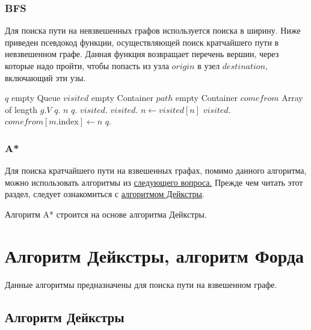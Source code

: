 \subsubsection{BFS}
Для поиска пути на невзвешенных графов используется поиска в ширину. Ниже приведен псевдокод функции,
осуществляющей поиск кратчайшего пути в невзвешенном графе. Данная функция возвращает перечень вершин,
через которые надо пройти, чтобы попасть из узла $origin$ в узел $destination$, включающий эти узы.
\begin{algorithmic}
  \State $q$ \asgn empty Queue
  \State $visited$ \asgn empty Container
  \State $path$ \asgn empty Container
  \State $comefrom$ \asgn Array of length $g.V$
  \State $q$.
    \State $n$ \asgn $q$.
    \State $visited$.
      \State $visited$.
        \State $n \gets visited[n]$
        \State $visited$.
      \EndWhile
      \State {}
    \EndIf
        \State $comefrom[m.\text{index}] \gets n$
        \State $q$.
      \EndIf
    \EndFor
  \EndWhile
  \State {} 
\EndFunction
\end{algorithmic}
\subsubsection{A*}
Для поиска кратчайшего пути на взвешенных графах, помимо данного алгоритма, можно
использовать алгоритмы из \hyperref[sec:dijkstra_ford]{следующего вопроса.}
Прежде чем читать этот раздел, следует ознакомиться с \hyperref[sec:dijkstra]{алгоритмом Дейкстры}.

Алгоритм A* строится на основе алгоритма Дейкстры.
\section{Алгоритм Дейкстры, алгоритм Форда}
Данные алгоритмы предназначены для поиска пути на взвешенном графе.
\label{sec:dijkstra_ford}
\subsection{Алгоритм Дейкстры}
\label{sec:dijkstra}





